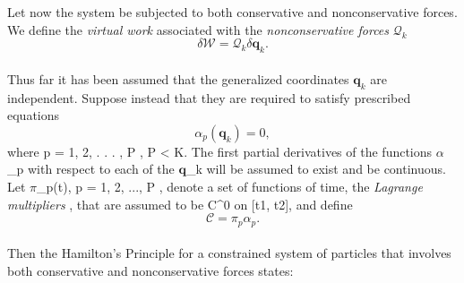 \\\\
Let now the system be subjected to both conservative and nonconservative forces. We define the \emph{virtual work} associated with the \emph{nonconservative forces} $\mathcal{Q}_k$  
\[ \delta\mathcal{W}=\mathcal{Q}_k\delta\mathbf{q}_k.\]
\\
Thus far it has been assumed that the generalized coordinates $\mathbf{q}_k$ are independent. Suppose instead that they are required to satisfy prescribed equations 
\[ \alpha_p(\mathbf{q}_k)=0, \] 
where p = 1, 2, . . . , P , P < K. The first partial derivatives of the functions $\alpha$_p with respect to each of the $\mathbf{q}$_k will be assumed to exist and be continuous.
\\Let $\pi$_p(t), p = 1, 2, ..., P , denote a set of functions of time, the \emph{Lagrange multipliers} , that are assumed to be C^0 on [t1, t2], and define
\[ \mathcal{C} = \pi_p\alpha_p.\]
\\
Then the Hamilton's Principle for a constrained system of particles that involves both conservative and nonconservative forces states:


\emph{}






  
  
  
  
  
  
  
  
  
  
  
  
  
  
  
  
  
  
  
  
  
  
  
  